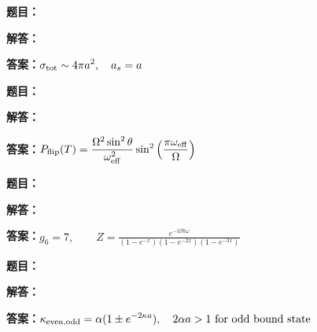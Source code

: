 \documentclass[lang=cn,color=blue,11pt]{elegantbook}
\begin{document}
\par
\noindent\textbf{题目：}
\par\noindent\textbf{解答：}
\par\noindent\textbf{答案：}\(\displaystyle \sigma_{\rm tot}\sim4\pi a^2,\quad a_s=a\)\par
\par\smallskip\noindent\hrulefill\par\medskip
{}\par
\noindent\textbf{题目：}
\par\noindent\textbf{解答：}
\par\noindent\textbf{答案：}\(\displaystyle P_{\rm flip}(T)=\frac{\Omega^2\sin^2\theta}{\omega_{\rm eff}^2}\sin^2\left(\frac{\pi\omega_{\rm eff}}{\Omega}\right)\)\par
\par\smallskip\noindent\hrulefill\par\medskip
{}\par
\noindent\textbf{题目：}
\par\noindent\textbf{解答：}
\par\noindent\textbf{答案：}\(\displaystyle g_6=7,\qquad Z=\frac{e^{-3\beta\hbar\omega}}{(1-e^{-x})(1-e^{-2x})(1-e^{-3x})}\)\par
\par\smallskip\noindent\hrulefill\par\medskip
{}\par
\noindent\textbf{题目：}
\par\noindent\textbf{解答：}
\par\noindent\textbf{答案：}\(\displaystyle \kappa_{\rm even,odd}=\alpha(1\pm e^{-2\kappa a}),\quad 2\alpha a>1\text{ for odd bound state}\)\par
\par\smallskip\noindent\hrulefill\par\medskip
\end{document}
